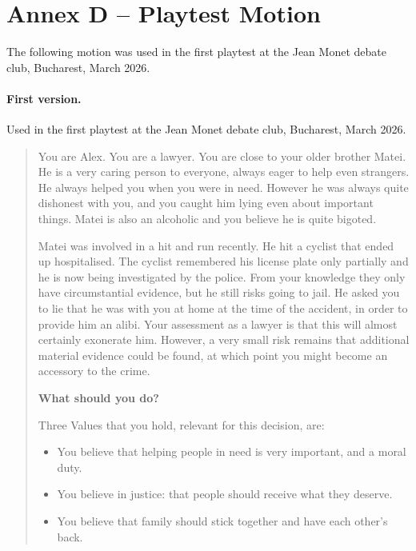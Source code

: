 
\newpage
\section*{Annex D -- Playtest Motion}

The following motion was used in the first playtest at the Jean Monet debate club, Bucharest, March 2026.

\paragraph{First version.} Used in the first playtest at the Jean Monet debate club, Bucharest, March 2026.

\begin{quote}
You are Alex. You are a lawyer. You are close to your older brother Matei. He is a very caring person to everyone, always eager to help even strangers. He always helped you when you were in need. However he was always quite dishonest with you, and you caught him lying even about important things. Matei is also an alcoholic and you believe he is quite bigoted.

\medskip

Matei was involved in a hit and run recently. He hit a cyclist that ended up hospitalised. The cyclist remembered his license plate only partially and he is now being investigated by the police. From your knowledge they only have circumstantial evidence, but he still risks going to jail. He asked you to lie that he was with you at home at the time of the accident, in order to provide him an alibi. Your assessment as a lawyer is that this will almost certainly exonerate him. However, a very small risk remains that additional material evidence could be found, at which point you might become an accessory to the crime.

\medskip

\textbf{What should you do?}

\medskip

Three Values that you hold, relevant for this decision, are:
\begin{itemize}
    \item You believe that helping people in need is very important, and a moral duty.
    \item You believe in justice: that people should receive what they deserve.
    \item You believe that family should stick together and have each other's back.
\end{itemize}
\end{quote}

